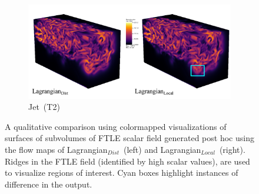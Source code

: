 \begin{figure}[!h]
\begin{subfigure}{\linewidth}
\centering
\includegraphics[width=0.9\linewidth,keepaspectratio, trim={0cm, 0cm, 0cm, 1cm}, clip]{Images/jet_ftle.pdf}
\vspace{-3mm}
\caption{Jet~(T2)}
\label{jet_ftle}
\end{subfigure}
\caption{A qualitative comparison using colormapped visualizations of surfaces of subvolumes of FTLE scalar field generated post hoc using the flow maps of Lagrangian$_{Dist}$~(left) and Lagrangian$_{Local}$~(right). Ridges in the FTLE field (identified by high scalar values), are used to visualize regions of interest. Cyan boxes highlight instances of difference in the output.}
\label{fig:ftle_visualizations}
\vspace{-6mm}
\end{figure}
